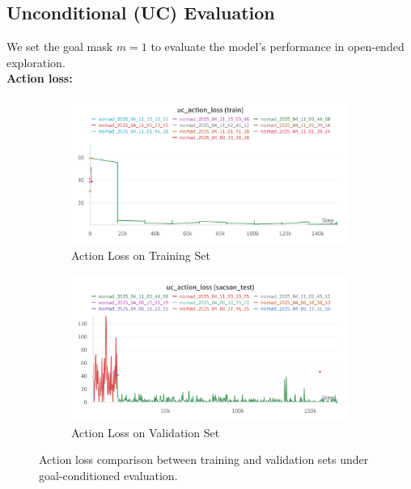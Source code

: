 \documentclass[12pt]{article}
\begin{document}
\subsection*{Unconditional (UC) Evaluation}
We set the goal mask $m = 1$ to evaluate the model's performance in open-ended exploration.\\
\noindent \textbf{Action loss:}\\
\begin{figure}[H]
    \centering
    \begin{subfigure}[b]{0.48\textwidth}
        \centering
        \includegraphics[width=\textwidth]{images/uc_action_train.png}
        \caption{Action Loss on Training Set}
        \label{fig:gc_action_loss_train}
    \end{subfigure}
    \hfill
    \begin{subfigure}[b]{0.48\textwidth}
        \centering
        \includegraphics[width=\textwidth]{images/uc_action_test.png}
        \caption{Action Loss on Validation Set}
        \label{fig:gc_action_loss_val}
    \end{subfigure}
    \caption{Action loss comparison between training and validation sets under goal-conditioned evaluation.}
\end{figure}
\end{document}
